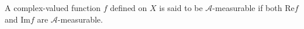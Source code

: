 A complex-valued function $f$ defined on $X$ is said to be $\mathcal{A}$-measurable if both $\text{Re}f$ and $\text{Im}f$ are $\mathcal{A}$-measurable.